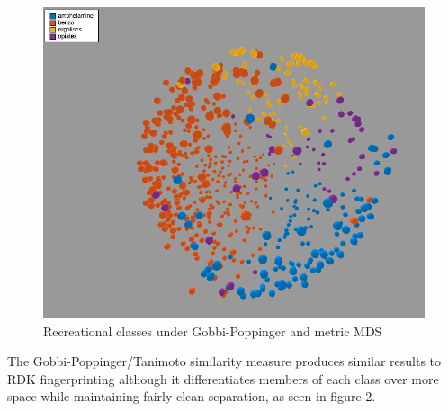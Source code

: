 \documentclass[12pt]{article}
\begin{document}
\begin{figure}[H]
  \centering
  \includegraphics[width=\textwidth]{rec-gobbi-mds}
  \captionsetup{justification=centering}
  \caption{Recreational classes under Gobbi-Poppinger and metric MDS}
\end{figure}

The Gobbi-Poppinger/Tanimoto similarity measure produces similar results to RDK fingerprinting although it differentiates members of each class over more space while maintaining fairly clean separation, as seen in figure 2.
\end{document}
